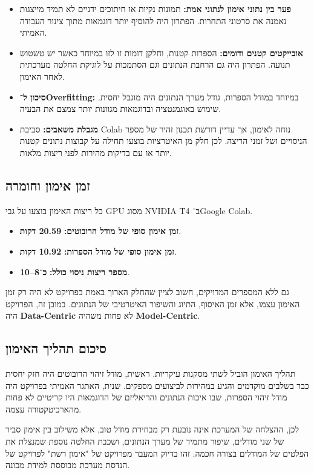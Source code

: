 \begin{itemize}
\item \textbf{פער בין נתוני אימון לנתוני אמת:} תמונות נקיות או חיתוכים
  ידניים לא תמיד מייצגות נאמנה את סרטוני התחרות. הפתרון היה להוסיף יותר
  דוגמאות מתוך צינור העבודה האמיתי.
\item \textbf{אובייקטים קטנים ודומים:} הספרות קטנות, וחלקן דומות זו
  לזו במיוחד כאשר יש טשטוש תנועה. הפתרון היה גם הרחבת הנתונים וגם
  הסתמכות על לוגיקת החלטה מערכתית לאחר האימון.
\item \textbf{סיכון ל־\textenglish{Overfitting}:} במיוחד במודל הספרות,
  גודל מערך הנתונים היה מוגבל יחסית. שימוש באוגמנטציה ובדוגמאות מגוונות
  יותר צמצם את הבעיה.
\item \textbf{מגבלת משאבים:} סביבת \textenglish{Colab} נוחה לאימון,
  אך עדיין דורשת תכנון זהיר של מספר הניסויים ושל זמני הריצה. לכן חלק מן
  האיטרציות בוצעו תחילה על קבוצות נתונים קטנות יותר או עם בדיקות מהירות
  לפני ריצות מלאות.
\end{itemize}

\subsection{זמן אימון וחומרה}

כל ריצות האימון בוצעו על גבי \textenglish{GPU} מסוג
\textenglish{NVIDIA T4} ב־\textenglish{Google Colab}.

\begin{itemize}
\item \textbf{זמן אימון סופי של מודל הרובוטים:} \textbf{20.59 דקות}.
\item \textbf{זמן אימון סופי של מודל הספרות:} \textbf{10.92 דקות}.
\item \textbf{מספר ריצות ניסוי כולל:} \textbf{כ־8--10}.
\end{itemize}

גם ללא המספרים המדויקים, חשוב לציין שהחלק הארוך באמת בפרויקט לא היה רק
זמן האימון עצמו, אלא זמן האיסוף, התיוג והשיפור האיטרטיבי של הנתונים.
במובן זה, הפרויקט היה \textbf{Data-Centric} לא פחות משהיה
\textbf{Model-Centric}.

\subsection{סיכום תהליך האימון}

תהליך האימון הוביל לשתי מסקנות עיקריות. ראשית, מודל זיהוי הרובוטים היה
חזק יחסית כבר בשלבים מוקדמים והגיע במהירות לביצועים מספקים. שנית,
האתגר האמיתי בפרויקט היה מודל זיהוי הספרות, שבו איכות הנתונים והריאליזם
של הדוגמאות היו קריטיים לא פחות מהארכיטקטורה עצמה.

לכן, ההצלחה של המערכת אינה נובעת רק מבחירת מודל טוב, אלא משילוב בין
אימון סביר של שני מודלים, שיפור מתמיד של מערך הנתונים, ושכבת החלטה
נוספת שמנצלת את הפלטים של המודלים בצורה חכמה. זהו בדיוק המעבר מפרויקט
של "אימון רשת" לפרויקט של הנדסת מערכת מבוססת למידת מכונה.
